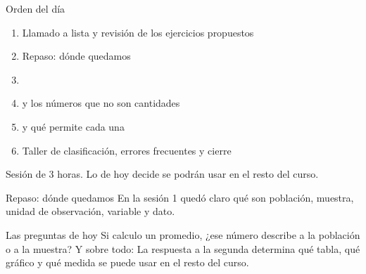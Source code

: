 \documentclass[aspectratio=169,10pt]{beamer}
\begin{document}
\portada

\begin{frame}{Orden del día}
  \begin{enumerate}
    \item Llamado a lista y revisión de los ejercicios propuestos
    \item Repaso: dónde quedamos
    \item {}
    \item {} y los números que no son cantidades
    \item {} y qué permite cada una
    \item Taller de clasificación, errores frecuentes y cierre
  \end{enumerate}

  \vspace{0.25cm}
  {\footnotesize\color{uniGris} Sesión de 3 horas. Lo de hoy decide
   se podrán usar en el resto
  del curso.}
\end{frame}

\begin{frame}{Repaso: dónde quedamos}
  En la sesión 1 quedó claro qué son población, muestra, unidad de observación,
  variable y dato.

  \vspace{0.25cm}
  \begin{alertblock}{Las preguntas de hoy}
    \footnotesize
    Si calculo un promedio, ¿ese número describe a la población o a la muestra?
    Y sobre todo:  La
    respuesta a la segunda determina qué tabla, qué gráfico y qué medida se
    puede usar en el resto del curso.
  \end{alertblock}
\end{frame}

\end{document}

